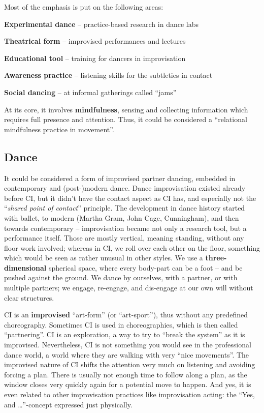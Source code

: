 Most of the emphasis is put on the following areas:

\begin{itemize*}
	\item [] \textbf{Experimental dance} -- practice-based research in dance labs
	\item [] \textbf{Theatrical form} -- improvised performances and lectures
	\item [] \textbf{Educational tool} -- training for dancers in improvisation
	\item [] \textbf{Awareness practice} -- listening skills for the subtleties in contact
	\item [] \textbf{Social dancing} -- at informal gatherings called ``jams''
\end{itemize*}

At its core, it involves \textbf{mindfulness}, sensing and collecting information which requires full presence and attention.
Thus, it could be considered a ``relational mindfulness practice in movement''.

\subsection{Dance}\label{subsec:dance}

It could be considered a form of improvised partner dancing, embedded in contemporary and (post-)modern dance.
Dance improvisation existed already before CI, but it didn't have the contact aspect as CI has, and especially not the ``\textit{shared point of contact}'' principle.
The development in dance history started with ballet, to modern (Martha Gram, John Cage, Cunningham), and then towards contemporary -- improvisation became not only a research tool, but a performance itself.
Those are mostly vertical, meaning standing, without any floor work involved; whereas in CI, we roll over each other on the floor, something which would be seen as rather unusual in other styles.
We use a \textbf{three-dimensional} spherical space, where every body-part can be a foot -- and be pushed against the ground.
We dance by ourselves, with a partner, or with multiple partners; we engage, re-engage, and dis-engage at our own will without clear structures.

CI is an \textbf{improvised} ``art-form'' (or ``art-sport''), thus without any predefined choreography.
Sometimes CI is used in choreographies, which is then called ``partnering''.
CI is an exploration, a way to try to ``break the system'' as it is improvised.
Nevertheless, CI is not something you would see in the professional dance world, a world where they are walking with very ``nice movements''.
The improvised nature of CI shifts the attention very much on listening and avoiding forcing a plan.
There is usually not enough time to follow along a plan, as the window closes very quickly again for a potential move to happen.
And yes, it is even related to other improvisation practices like improvisation acting: the ``Yes, and \ldots''-concept expressed just physically.

